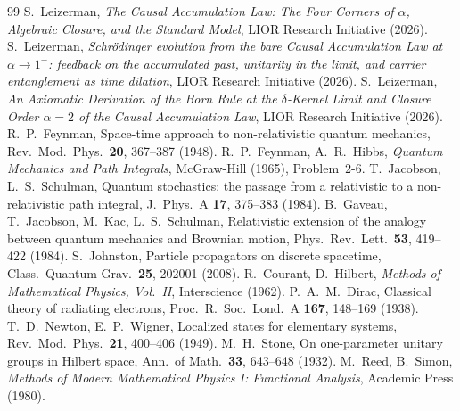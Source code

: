 \documentclass[11pt]{amsart}
\theoremstyle{definition}
\theoremstyle{remark}
\begin{document}
\begin{thebibliography}{99}
 S.~Leizerman, \emph{The Causal Accumulation Law: The Four Corners of $\alpha$, Algebraic Closure, and the Standard Model}, LIOR Research Initiative (2026).
 S.~Leizerman, \emph{Schr\"odinger evolution from the bare Causal Accumulation Law at $\alpha\to1^-$: feedback on the accumulated past, unitarity in the limit, and carrier entanglement as time dilation}, LIOR Research Initiative (2026).
 S.~Leizerman, \emph{An Axiomatic Derivation of the Born Rule at the $\delta$-Kernel Limit and Closure Order $\alpha=2$ of the Causal Accumulation Law}, LIOR Research Initiative (2026).
 R.~P.~Feynman, Space-time approach to non-relativistic quantum mechanics, Rev.\ Mod.\ Phys.\ \textbf{20}, 367--387 (1948).
 R.~P.~Feynman, A.~R.~Hibbs, \emph{Quantum Mechanics and Path Integrals}, McGraw-Hill (1965), Problem~2-6.
 T.~Jacobson, L.~S.~Schulman, Quantum stochastics: the passage from a relativistic to a non-relativistic path integral, J.\ Phys.\ A \textbf{17}, 375--383 (1984).
 B.~Gaveau, T.~Jacobson, M.~Kac, L.~S.~Schulman, Relativistic extension of the analogy between quantum mechanics and Brownian motion, Phys.\ Rev.\ Lett.\ \textbf{53}, 419--422 (1984).
 S.~Johnston, Particle propagators on discrete spacetime, Class.\ Quantum Grav.\ \textbf{25}, 202001 (2008).
 R.~Courant, D.~Hilbert, \emph{Methods of Mathematical Physics, Vol.~II}, Interscience (1962).
 P.~A.~M.~Dirac, Classical theory of radiating electrons, Proc.\ R.\ Soc.\ Lond.\ A \textbf{167}, 148--169 (1938).
 T.~D.~Newton, E.~P.~Wigner, Localized states for elementary systems, Rev.\ Mod.\ Phys.\ \textbf{21}, 400--406 (1949).
 M.~H.~Stone, On one-parameter unitary groups in Hilbert space, Ann.\ of Math.\ \textbf{33}, 643--648 (1932).
 M.~Reed, B.~Simon, \emph{Methods of Modern Mathematical Physics I: Functional Analysis}, Academic Press (1980).
\end{thebibliography}
\end{document}
